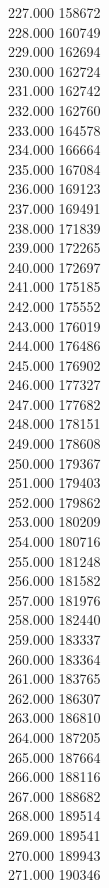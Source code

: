 { 227.000	158672 \\
 228.000	160749 \\
 229.000	162694 \\
 230.000	162724 \\
 231.000	162742 \\
 232.000	162760 \\
 233.000	164578 \\
 234.000	166664 \\
 235.000	167084 \\
 236.000	169123 \\
 237.000	169491 \\
 238.000	171839 \\
 239.000	172265 \\
 240.000	172697 \\
 241.000	175185 \\
 242.000	175552 \\
 243.000	176019 \\
 244.000	176486 \\
 245.000	176902 \\
 246.000	177327 \\
 247.000	177682 \\
 248.000	178151 \\
 249.000	178608 \\
 250.000	179367 \\
 251.000	179403 \\
 252.000	179862 \\
 253.000	180209 \\
 254.000	180716 \\
 255.000	181248 \\
 256.000	181582 \\
 257.000	181976 \\
 258.000	182440 \\
 259.000	183337 \\
 260.000	183364 \\
 261.000	183765 \\
 262.000	186307 \\
 263.000	186810 \\
 264.000	187205 \\
 265.000	187664 \\
 266.000	188116 \\
 267.000	188682 \\
 268.000	189514 \\
 269.000	189541 \\
 270.000	189943 \\
 271.000	190346 \\
}
